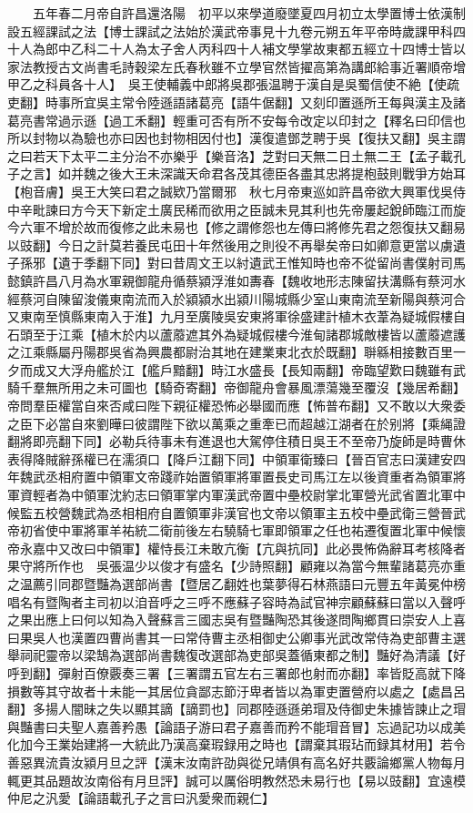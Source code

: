 　　五年春二月帝自許昌還洛陽　初平以來學道廢墜夏四月初立太學置博士依漢制設五經課試之法【博士課試之法始於漢武帝事見十九卷元朔五年平帝時歲課甲科四十人為郎中乙科二十人為太子舍人丙科四十人補文學掌故東都五經立十四博士皆以家法教授古文尚書毛詩穀梁左氏春秋雖不立學官然皆擢高第為講郎給事近署順帝增甲乙之科員各十人】　吳王使輔義中郎將吳郡張温聘于漢自是吳蜀信使不絶【使疏吏翻】時事所宜吳主常令陸遜語諸葛亮【語牛倨翻】又刻印置遜所王每與漢主及諸葛亮書常過示遜【過工禾翻】輕重可否有所不安每令改定以印封之【釋名曰印信也所以封物以為驗也亦曰因也封物相因付也】漢復遣鄧芝聘于吳【復扶又翻】吳主謂之曰若天下太平二主分治不亦樂乎【樂音洛】芝對曰天無二日土無二王【孟子載孔子之言】如并魏之後大王未深識天命君各茂其德臣各盡其忠將提枹鼓則戰爭方始耳【枹音膚】吳王大笑曰君之誠欵乃當爾邪　秋七月帝東巡如許昌帝欲大興軍伐吳侍中辛毗諫曰方今天下新定土廣民稀而欲用之臣誠未見其利也先帝屢起銳師臨江而旋今六軍不增於故而復修之此未易也【修之謂修怨也左傳曰將修先君之怨復扶又翻易以豉翻】今日之計莫若養民屯田十年然後用之則役不再舉矣帝曰如卿意更當以虜遺子孫邪【遺于季翻下同】對曰昔周文王以紂遺武王惟知時也帝不從留尚書僕射司馬懿鎮許昌八月為水軍親御龍舟循蔡潁浮淮如夀春【魏收地形志陳留扶溝縣有蔡河水經蔡河自陳留浚儀東南流而入於潁潁水出潁川陽城縣少室山東南流至新陽與蔡河合又東南至慎縣東南入于淮】九月至廣陵吳安東將軍徐盛建計植木衣葦為疑城假樓自石頭至于江乘【植木於内以蘆䕠遮其外為疑城假樓今淮甸諸郡城敵樓皆以蘆䕠遮護之江乘縣屬丹陽郡吳省為興農都尉治其地在建業東北衣於既翻】聨緜相接數百里一夕而成又大浮舟艦於江【艦戶黯翻】時江水盛長【長知兩翻】帝臨望歎曰魏雖有武騎千羣無所用之未可圖也【騎奇寄翻】帝御龍舟會暴風漂蕩幾至覆沒【幾居希翻】帝問羣臣權當自來否咸曰陛下親征權恐怖必舉國而應【怖普布翻】又不敢以大衆委之臣下必當自來劉曄曰彼謂陛下欲以萬乘之重牽已而超越江湖者在於别將【乘䋲證翻將即亮翻下同】必勒兵待事未有進退也大駕停住積日吳王不至帝乃旋師是時曹休表得降賊辭孫權已在濡須口【降戶江翻下同】中領軍衛臻曰【晉百官志曰漢建安四年魏武丞相府置中領軍文帝踐祚始置領軍將軍置長史司馬江左以後資重者為領軍將軍資輕者為中領軍沈約志曰領軍掌内軍漢武帝置中壘校尉掌北軍營光武省置北軍中候監五校營魏武為丞相相府自置領軍非漢官也文帝以領軍主五校中壘武衛三營晉武帝初省使中軍將軍羊祐統二衛前後左右驍騎七軍即領軍之任也祐遷復置北軍中候懷帝永嘉中又改曰中領軍】權恃長江未敢亢衡【亢與抗同】此必畏怖偽辭耳考核降者果守將所作也　吳張温少以俊才有盛名【少詩照翻】顧雍以為當今無輩諸葛亮亦重之温薦引同郡暨豔為選部尚書【暨居乙翻姓也葉夢得石林燕語曰元豐五年黃冕仲榜唱名有暨陶者主司初以洎音呼之三呼不應蘇子容時為試官神宗顧蘇蘇曰當以入聲呼之果出應上曰何以知為入聲蘇言三國志吳有暨豔陶恐其後遂問陶鄉貫曰崇安人上喜曰果吳人也漢置四曹尚書其一曰常侍曹主丞相御史公卿事光武改常侍為吏部曹主選舉祠祀靈帝以梁鵠為選部尚書魏復改選部為吏部吳蓋循東都之制】豔好為清議【好呼到翻】彈射百僚覈奏三署【三署謂五官左右三署郎也射而亦翻】率皆貶高就下降損數等其守故者十未能一其居位貪鄙志節汙卑者皆以為軍吏置營府以處之【處昌呂翻】多揚人闇昧之失以顯其謫【謫罰也】同郡陸遜遜弟瑁及侍御史朱據皆諫止之瑁與豔書曰夫聖人嘉善矜愚【論語子游曰君子嘉善而矜不能瑁音冒】忘過記功以成美化加今王業始建將一大統此乃漢高棄瑕録用之時也【謂棄其瑕玷而録其材用】若令善惡異流貴汝潁月旦之評【漢末汝南許劭與從兄靖俱有高名好共覈論鄉黨人物每月輒更其品題故汝南俗有月旦評】誠可以厲俗明教然恐未易行也【易以豉翻】宜遠模仲尼之汎愛【論語載孔子之言曰汎愛衆而親仁】